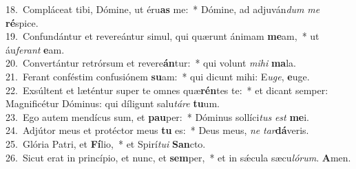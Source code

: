 {18.~}Compláceat tibi, Dómine, ut éru\textbf{as} me:~* Dómine, ad adjuván\textit{dum} \textit{me} \textbf{ré}spice.\\
{19.~}Confundántur et revereántur simul, qui quærunt ánimam \textbf{me}am,~* ut áu\textit{fe}\textit{rant} \textbf{e}am.\\
{20.~}Convertántur retrórsum et revere\textbf{án}tur:~* qui volunt \textit{mi}\textit{hi} \textbf{ma}la.\\
{21.~}Ferant conféstim confusiónem \textbf{su}am:~* qui dicunt mihi: E\textit{u}\textit{ge}, \textbf{e}uge.\\
{22.~}Exsúltent et læténtur super te omnes quæ\textbf{rén}tes te:~* et dicant semper: Magnificétur Dóminus: qui díligunt salu\textit{tá}\textit{re} \textbf{tu}um.\\
{23.~}Ego autem mendícus sum, et \textbf{pau}per:~* Dóminus sollíci\textit{tus} \textit{est} \textbf{me}i.\\
{24.~}Adjútor meus et protéctor meus \textbf{tu} es:~* Deus meus, \textit{ne} \textit{tar}\textbf{dá}veris.\\
{25.~}Glória Patri, et \textbf{Fí}lio,~* et Spirí\textit{tu}\textit{i} \textbf{San}cto.\\
{26.~}Sicut erat in princípio, et nunc, et \textbf{sem}per,~* et in sǽcula sæcu\textit{ló}\textit{rum}. \textbf{A}men.\\
